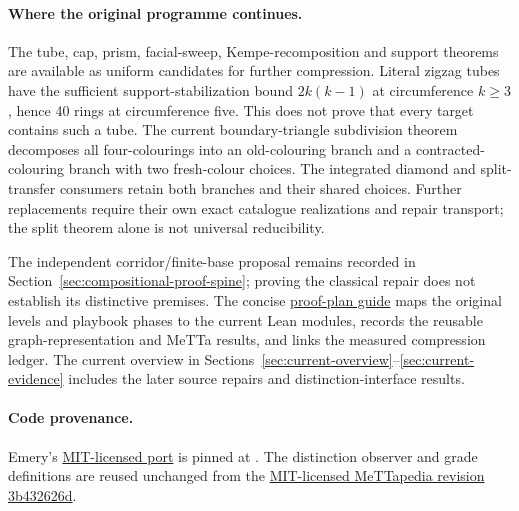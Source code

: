 \paragraph{Where the original programme continues.}
The tube, cap, prism, facial-sweep, Kempe-recomposition and support theorems
are available as uniform candidates for further compression. Literal zigzag tubes have
the sufficient support-stabilization bound \(2k(k-1)\) at circumference
\(k\geq3\), hence 40 rings at circumference five. This does not prove that
every target contains such a tube. The current boundary-triangle subdivision
theorem decomposes all four-colourings into an old-colouring branch and a
contracted-colouring branch with two fresh-colour choices. The integrated
diamond and split-transfer consumers retain both branches and their shared
choices. Further replacements require their own exact catalogue
realizations and repair transport; the split theorem alone is not universal
reducibility.

The independent corridor/finite-base proposal remains recorded in
Section~\ref{sec:compositional-proof-spine}; proving the classical repair
does not establish its distinctive premises. The concise
\href{fourcolor-compositional/README.md}{proof-plan guide} maps the original
levels and playbook phases to the current Lean modules, records the reusable
graph-representation and MeTTa results, and links the measured compression
ledger. The current overview in
Sections~\ref{sec:current-overview}--\ref{sec:current-evidence} includes the
later source repairs and distinction-interface results.

\paragraph{Code provenance.}
Emery's \href{https://github.com/corun1024/4ct/tree/3db71e0a786a1f19be04c5266fe3d06fed216885}{MIT-licensed port}
is pinned at .
The distinction observer and grade definitions are reused unchanged from
the \href{https://github.com/zariuq/MeTTapedia/tree/3b432626d1b8ca6c7f3ec8b9b69b15431023a34b/lean/mettapedia/Mettapedia/Cybernetics/DistinctionCalculus}{MIT-licensed MeTTapedia revision 3b432626d}.
